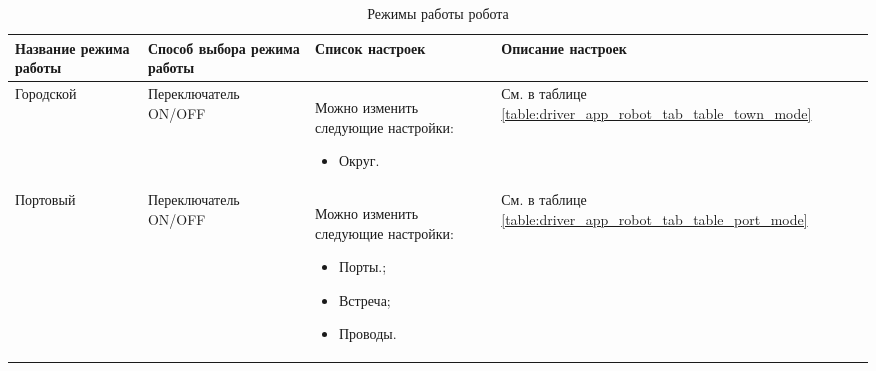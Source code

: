       \begin{table}
          \begin{center}
          \label{driver_app_robot_tab_modes}
          \caption {Режимы работы робота}
          \setlength{\extrarowheight}{2mm}
          \begin{tabular}{|p{3cm}|p{3cm}|p{6cm}|p{3cm}|}

            \hline     \textbf{Название режима работы}&\textbf{Способ выбора режима работы}&\textbf{Список настроек}&\textbf{Описание настроек} \\ [2mm]

            \hline   Городской & Переключатель ON/OFF & Можно изменить следующие настройки: \begin{itemize} \item Округ. \end{itemize} & См. в таблице \ref{table:driver_app_robot_tab_table_town_mode} \\ [2mm]

            \hline   Портовый & Переключатель ON/OFF & Можно изменить следующие настройки: \begin{itemize} \item Порты.;  \item Встреча;  \item Проводы. \end{itemize} & См. в таблице \ref{table:driver_app_robot_tab_table_port_mode}  \\ [2mm]

            \hline
          \end{tabular}
          \end{center}
      \end{table}

